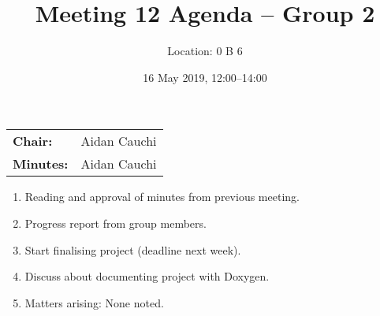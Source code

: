 \documentclass[11pt,a4paper]{article}
\title{Meeting 12 Agenda -- Group 2}
\author{Location: 0 B 6}
\date{16 May 2019, 12:00--14:00}
\begin{document}
\maketitle
\begin{center}
\begin{tabular}{ll}
\textbf{Chair:}   & Aidan Cauchi \\
\textbf{Minutes:} & Aidan Cauchi
\end{tabular}
\end{center}

\begin{enumerate}

\item Reading and approval of minutes from previous meeting.

\item Progress report from group members.

\item Start finalising project (deadline next week).

\item Discuss about documenting project with Doxygen.

\item Matters arising: None noted.

\end{enumerate}
\end{document}
